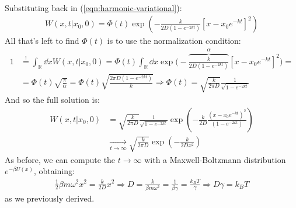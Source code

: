\documentclass[../template.tex]{subfiles}
\begin{document}
\begin{example}
\begin{align*}
    \end{align*}
    Substituting back in (\ref{eqn:harmonic-variational}):
    \begin{align*}
        W(x,t|x_0,0) = \Phi(t) \exp\left(-\frac{k}{2D (1-e^{-2kt})} [x-x_0 e^{-kt}]^2 \right)
    \end{align*}
    All that's left to find $\Phi(t)$ is to use the normalization condition:
    \begin{align*}
        1 &\overset{!}{=} \int_{\mathbb{R}} \dd{x} W(x,t|x_0,0) = \Phi(t) \int_{\mathbb{R}} \dd{x} \exp\Bigg(-\overbrace{\frac{k}{2D (1-e^{-2kt})}}^{\alpha} [x-x_0 e^{-kt}]^2 \Bigg) =\\
        &= \Phi(t) \sqrt{\frac{\pi}{\alpha} } = \Phi(t) \sqrt{\frac{2 \pi D (1-e^{-2kt}) }{k} } \Rightarrow \Phi(t) = \sqrt{\frac{k}{2 \pi D} } \frac{1}{\sqrt{1 - e^{-2kt}}} 
    \end{align*}
    And so the full solution is:
    \begin{align*}
        W(x,t|x_0,0) &= \sqrt{\frac{k}{2 \pi D}} \frac{1}{\sqrt{1 - e^{-2kt}}}  \exp\left(-\frac{k}{2D} \frac{(x- x_0 e^{-kt})^2}{(1-e^{-2kt})}  \right)\\  &\xrightarrow[t \to \infty]{}   \sqrt{\frac{k}{2 \pi D} } \exp\left(-\frac{k}{2D x^2} \right)
    \end{align*}
    As before, we can compute the $t \to \infty$ with a Maxwell-Boltzmann distribution $e^{- \beta U(x)}$, obtaining:
    \begin{align*}
        \frac{1}{2} \beta m \omega^2 x^2 = \frac{k}{2D} x^2 \Rightarrow D = \frac{k}{\beta m \omega^2} = \frac{1}{\beta \gamma} = \frac{k_B T}{\gamma} \Rightarrow D \gamma = k_B T     
    \end{align*}
    as we previously derived.
\end{example}
\end{document}
